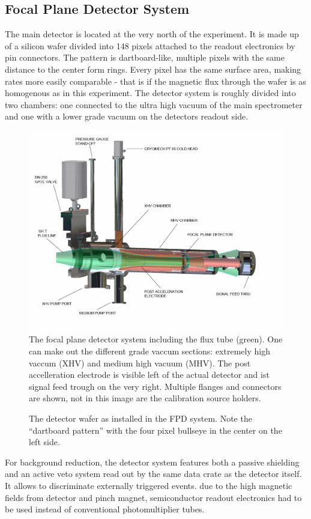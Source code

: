       \subsection{Focal Plane Detector System}
      \label{ch:The KATRIN experiment:sec:Experimental setup:subsec:FPD system}
      The main detector is located at the very north of the experiment. It is made up of a silicon wafer divided into 148 pixels attached to the readout electronics by pin connectors. The pattern is dartboard-like, multiple pixels with the same distance to the center form rings. Every pixel has the same surface area, making rates more easily comparable - that is if the magnetic flux through the wafer is as homogenous as in this experiment.
      The detector system is roughly divided into two chambers: one connected to the ultra high vacuum of the main spectrometer and one with a lower grade vacuum on the detectors readout side.
      \begin{figure}
      \centering
	\includegraphics[width = 0.8 \textwidth]{graphics/katrinExperiment/detectorHousing.pdf}
	\caption[Focal plane detector system]{The focal plane detector system including the flux tube (green). One can make out the different grade vaccum sections: extremely high vaccum (XHV) and medium high vacuum (MHV). The post accelleration electrode is visible left of the actual detector and ist signal feed trough on the very right. Multiple flanges and connectors are shown, not in this image are the calibration source holders.}
	\label{fig:katrinExperiment:detectorHousing}
      \end{figure}
      \begin{figure}
	  \caption[Detector wafer]{The detector wafer as installed in the FPD system. Note the ``dartboard pattern'' with the four pixel bullseye in the center on the left side.}
	  \label{fig:katrinExperiment:detectorWafer}
      \end{figure}
      For background reduction, the detector system features both a passive shielding and an active veto system read out by the same data crate as the detector itself. It allows to discriminate externally triggered events. due to the high magnetic fields from detector and pinch magnet, semiconductor readout electronics had to be used instead of conventional photomultiplier tubes.
